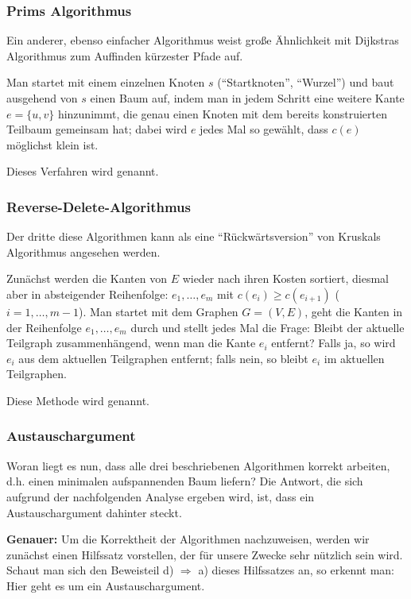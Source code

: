 \documentclass[smaller]{beamer}
\begin{document}
\begin{frame}
\frametitle{Prims Algorithmus}
Ein anderer, ebenso einfacher Algorithmus weist große Ähnlichkeit mit Dijkstras Algorithmus zum Auffinden kürzester Pfade auf. \\ \vspace*{0.2cm}

Man startet mit einem einzelnen Knoten $s$ (\enquote{Startknoten}, \enquote{Wurzel}) und baut ausgehend von $s$ einen Baum auf, indem man in jedem Schritt eine weitere Kante $e=\big\{u,v\big\}$ hinzunimmt, die genau einen Knoten mit dem bereits konstruierten Teilbaum gemeinsam hat; dabei wird $e$ jedes Mal so gewählt, dass $c(e)$ möglichst klein ist. \\ \vspace*{0.2cm}

Dieses Verfahren wird  genannt.
\end{frame}

\begin{frame}
\frametitle{Reverse-Delete-Algorithmus}
Der dritte diese Algorithmen kann als eine \enquote{Rückwärtsversion} von Kruskals Algorithmus angesehen werden. \\ \vspace*{0.2cm}

Zunächst werden die Kanten von $E$ wieder nach ihren Kosten sortiert, diesmal aber in absteigender Reihenfolge: $e_1,\ldots, e_m$ mit $c(e_i) \geq c(e_{i+1})$ ($i=1,\ldots,m-1$). Man startet mit dem Graphen $G=(V,E)$, geht die Kanten in der Reihenfolge $e_1,\ldots,e_m$ durch und stellt jedes Mal die Frage: \alert{Bleibt der aktuelle Teilgraph zusammenhängend, wenn man die Kante $e_i$ entfernt?} Falls ja, so wird $e_i$ aus dem aktuellen Teilgraphen entfernt; falls nein, so bleibt $e_i$ im aktuellen Teilgraphen. \\ \vspace*{0.2cm}

Diese Methode wird  genannt.
\end{frame}

\begin{frame}
\frametitle{Austauschargument}
Woran liegt es nun, dass alle drei beschriebenen Algorithmen korrekt arbeiten, d.h. einen minimalen aufspannenden Baum liefern? Die Antwort, die sich aufgrund der nachfolgenden Analyse ergeben wird, ist, dass ein \alert{Austauschargument}  dahinter steckt. \\ \vspace*{0.2cm}

\textbf{Genauer:} Um die Korrektheit der Algorithmen nachzuweisen, werden wir zunächst einen Hilfssatz vorstellen, der für unsere Zwecke sehr nützlich sein wird. Schaut man sich den Beweisteil d) $\Rightarrow$ a) dieses Hilfssatzes an, so erkennt man: Hier geht es um ein \alert{Austauschargument.} 
\end{frame}
\end{document}
